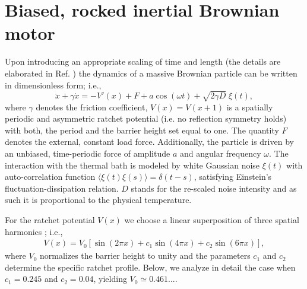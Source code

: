 \documentclass{elsart}
\begin{document}
\section{Biased, rocked inertial Brownian motor}
\label{model} Upon introducing an appropriate scaling of time and
length (the details are elaborated in Ref. \cite{machura1}) the
dynamics of a massive Brownian particle can be written in
dimensionless form; i.e.,
%
\begin{equation}
\ddot{{x}} + {\gamma} \dot{ x} =- {V}'({x}) + {F}
+ a \cos(\omega {t}) + \sqrt{2{\gamma}D} \; {\xi}
({t}), \label{NLbw}
\end{equation}
where $\gamma$ denotes the friction coefficient, $V(x)=V(x+1)$ is a
spatially periodic and asymmetric ratchet potential (i.e. no
reflection symmetry holds) with both, the period and the barrier
height set equal to one.  The quantity $F$ denotes the external,
constant load force. Additionally, the particle is driven by an
unbiased, time-periodic force of amplitude $a$ and angular frequency
$\omega$.  The interaction with the thermal bath is modeled by white
Gaussian noise $\xi(t)$ with auto-correlation function $\langle
\xi(t)\xi(s)\rangle = \delta(t-s)$, satisfying Einstein's
fluctuation-dissipation relation. $D$ stands for the re-scaled noise
intensity and as such it is proportional to the physical
temperature.

For the ratchet potential $V(x)$ we choose a linear superposition of
three spatial harmonics \cite{machura1}; i.e.,
%
\begin{eqnarray}\label{pot}
V(x) = V_0 [\sin(2 \pi x) + c_1 \sin (4 \pi x) + c_2 \sin (6 \pi
x)],
\end{eqnarray}
%
where $V_0$ normalizes the barrier height to unity and the parameters
$c_1$ and $c_2$ determine the specific ratchet profile.  Below, we
analyze in detail the case when $c_1=0.245$ and $c_2=0.04$, yielding
$V_0\simeq{0.461...}$.
\end{document}
